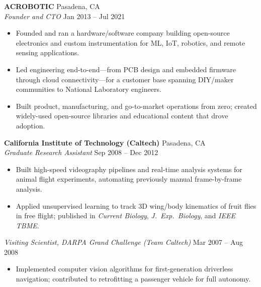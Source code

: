 \documentclass[11pt]{article}
\begin{document}
\vspace{0.2em}
\textbf{ACROBOTIC} \hfill Pasadena, CA\\
\textit{Founder and CTO} \hfill Jan 2013 -- Jul 2021
\begin{itemize}
    \item Founded and ran a hardware/software company building open-source electronics and custom instrumentation for ML, IoT, robotics, and remote sensing applications.
    \item Led engineering end-to-end---from PCB design and embedded firmware through cloud connectivity---for a customer base spanning DIY/maker communities to National Laboratory engineers.
    \item Built product, manufacturing, and go-to-market operations from zero; created widely-used open-source libraries and educational content that drove adoption.
\end{itemize}

\vspace{0.2em}
\textbf{California Institute of Technology (Caltech)} \hfill Pasadena, CA\\
\textit{Graduate Research Assistant} \hfill Sep 2008 -- Dec 2012
\begin{itemize}
    \item Built high-speed videography pipelines and real-time analysis systems for animal flight experiments, automating previously manual frame-by-frame analysis.
    \item Applied unsupervised learning to track 3D wing/body kinematics of fruit flies in free flight; published in \emph{Current Biology}, \emph{J.~Exp.~Biology}, and \emph{IEEE TBME}.
\end{itemize}

\textit{Visiting Scientist, DARPA Grand Challenge (Team Caltech)} \hfill Mar 2007 -- Aug 2008
\begin{itemize}
    \item Implemented computer vision algorithms for first-generation driverless navigation; contributed to retrofitting a passenger vehicle for full autonomy.
\end{itemize}
\end{document}
